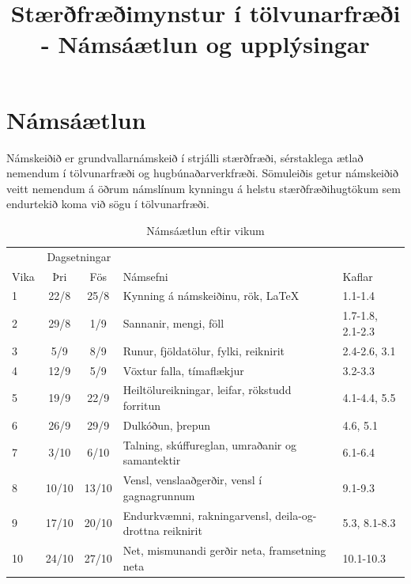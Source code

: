 \documentclass[justified, nobib]{tufte-handout}
\title{Stærðfræðimynstur í tölvunarfræði  \semester - Námsáætlun og upplýsingar}
\begin{document}
\section{Námsáætlun}
\label{sec:schedule}

Námskeiðið er grundvallarnámskeið í strjálli stærðfræði, sérstaklega ætlað nemendum í tölvunarfræði og hugbúnaðarverkfræði. 
Sömuleiðis getur námskeiðið veitt nemendum á öðrum námslínum kynningu á helstu stærðfræðihugtökum sem endurtekið koma við sögu í tölvunarfræði.

\begin{table}
\caption{Námsáætlun eftir vikum}
\label{tab:schedule}
\begin{center}
\begin{tabularx}{\linewidth}{lccXp{3cm}}
\toprule
&\multicolumn{2}{c}{Dagsetningar}&&\\
\cmidrule{2-3}
Vika&Þri&Fös&Námsefni&Kaflar\\
\midrule
1	&22/8	&25/8	& Kynning á námskeiðinu, rök, \LaTeX                                                                    &1.1-1.4\\
2	&29/8	&1/9	& Sannanir, mengi, föll                                                                                 &1.7-1.8, 2.1-2.3\\
3	&5/9	&8/9	& Runur, fjöldatölur, fylki, reiknirit                                                                  &2.4-2.6, 3.1\\
4	&12/9	&5/9	& Vöxtur falla, tímaflækjur                                                                             &3.2-3.3\\
5	&19/9	&22/9	& Heiltölureikningar, leifar, rökstudd forritun                                                         &4.1-4.4, 5.5\\
6	&26/9	&29/9	& Dulkóðun, þrepun                                                                                      &4.6, 5.1\\
7	&3/10	&6/10	& Talning, skúffureglan, umraðanir og samantektir                                                       &6.1-6.4\\
8	&10/10	&13/10	& Vensl, venslaaðgerðir, vensl í gagnagrunnum                                                           &9.1-9.3\\
9	&17/10	&20/10	& Endurkvæmni, rakningarvensl, deila-og-drottna reiknirit                                               &5.3, 8.1-8.3\\
10	&24/10	&27/10	& Net, mismunandi gerðir neta, framsetning neta                                                         &10.1-10.3\\

\end{tabularx}
\end{center}
\end{table}
\end{document}

